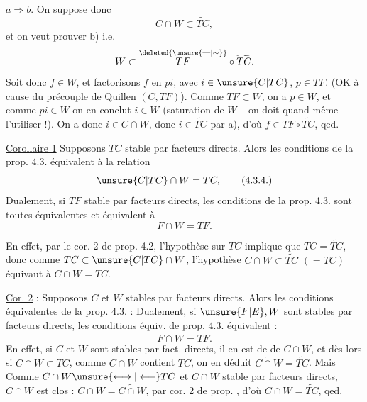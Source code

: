 $a\Longrightarrow b$. On suppose donc
\[
C\cap W\subset\widetilde{TC},
\]
et on veut prouver b) i.e.
\[
W\subset\overset{\deleted{\unsure{\text{---}|\sim}}}{TF}\circ\widetilde{TC}.
\]
Soit donc $f\in W$, et factorisons $f$ en $pi$, avec $i\in\unsure{C|TC}$, $p\in TF$. (OK à cause du précouple de Quillen $(C,TF)$). Comme $TF\subset W$, on a $p\in W$, et comme $pi\in W$ on en conclut $i\in W$ (saturation  de $W$ -- on doit quand même l'utiliser !). On a donc $i\in C\cap W$, donc $i\in\widetilde{TC}$ par a), d'où $f\in TF\circ\widetilde{TC}$, qed.

\uline{Corollaire 1} Supposons $TC$ stable par facteurs directs.
Alors  les conditions de la prop. 4.3.  équivalent à la relation
\[
\unsure{C|TC}\cap W=TC,
\tag*{(4.3.4.)}
\]
Dualement, si $TF$ stable par facteurs directs, les conditions de la prop. 4.3. sont toutes équivalentes et équivalent à
\[
F\cap W=TF.
\tag*{(4.3.4')}
\]

En effet, par le cor. 2 de prop. 4.2, l'hypothèse sur $TC$ implique que $TC=\widetilde{TC}$, donc comme $TC\subset\unsure{C|TC}\cap W$, l'hypothèse $C\cap W\subset\widetilde{TC}$ $(=TC)$ équivaut à $C\cap W=TC$.

\uline{Cor. 2} : Supposons $C$ et $W$ stables par facteurs directs. Alors les conditions équivalentes de la prop. 4.3.  :
Dualement, si $\unsure{F|E},W$ sont stables par facteurs directs, les conditions équiv. de prop. 4.3. équivalent :
\[
F\cap W=\overline{TF}.
\tag*{(4.3.5')}
\]
En effet, si $C$ et $W$ sont stables par fact. directs, il en est de  de $C\cap W$, et  dès lors si $C\cap W\subset\widetilde{TC}$, comme $C\cap W$ contient $TC$,  on en déduit $\widetilde{C\cap W}=\widetilde{TC}$. Mais  Comme $C\cap W\unsure{\longleftrightarrow|\longleftarrow}TC$ et $C\cap W$ stable par facteurs directs, $C\cap W$ est clos :   $C\cap W=\widetilde{C\cap W}$, par cor. 2 de prop. , d'où $C\cap W=\widetilde{TC}$, qed.

